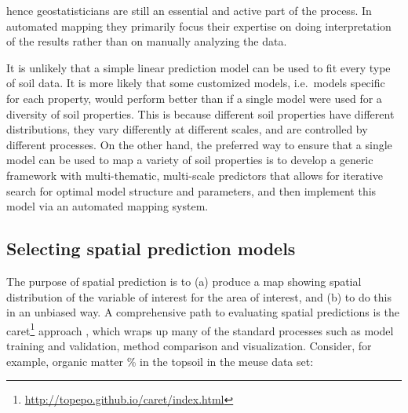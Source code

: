 \documentclass[graybox,natbib,nospthms,UStrade]{svmono}
\newenvironment{Shaded}{\begin{snugshade}}{\end{snugshade}}
\newcommand{\CommentTok}[1]{\textcolor[rgb]{0.37,0.37,0.37}{\textit{#1}}}
\newcommand{\DataTypeTok}[1]{\textcolor[rgb]{0.27,0.27,0.27}{#1}}
\newcommand{\DecValTok}[1]{\textcolor[rgb]{0.06,0.06,0.06}{#1}}
\newcommand{\KeywordTok}[1]{\textcolor[rgb]{0.27,0.27,0.27}{\textbf{#1}}}
\newcommand{\NormalTok}[1]{#1}
\newcommand{\OperatorTok}[1]{\textcolor[rgb]{0.43,0.43,0.43}{\textbf{#1}}}
\newcommand{\OtherTok}[1]{\textcolor[rgb]{0.37,0.37,0.37}{#1}}
\newcommand{\StringTok}[1]{\textcolor[rgb]{0.5,0.5,0.5}{#1}}
\renewcommand{\href}[2]{#2 (\url{#1})}
\renewcommand{\href}[2]{#2\footnote{\url{#1}}}
\begin{document}
hence geostatisticians are still an essential and active part of the
process. In automated mapping they primarily focus their expertise on
doing interpretation of the results rather than on manually analyzing
the data.

It is unlikely that a simple linear prediction model can be used to fit
every type of soil data. It is more likely that some customized models,
i.e.~models specific for each property, would perform better than if a
single model were used for a diversity of soil properties. This is
because different soil properties have different distributions, they
vary differently at different scales, and are controlled by different
processes. On the other hand, the preferred way to ensure that a single
model can be used to map a variety of soil properties is to develop a
generic framework with multi-thematic, multi-scale predictors that
allows for iterative search for optimal model structure and parameters,
and then implement this model via an automated mapping system.

\hypertarget{selecting-spatial-prediction-models}{%
\subsection{Selecting spatial prediction models}\label{selecting-spatial-prediction-models}}

The purpose of spatial prediction is to (a) produce a map showing spatial distribution of the variable of interest for the area of interest, and (b) to do this in an unbiased way. A comprehensive path to evaluating spatial predictions is the \href{http://topepo.github.io/caret/index.html}{caret} approach \citep{kuhn2013applied}, which wraps up many of the standard processes such as model training and validation, method comparison and visualization. Consider, for example, organic matter \% in the topsoil in the meuse data set:

\begin{Shaded}
\end{Shaded}
\end{document}
